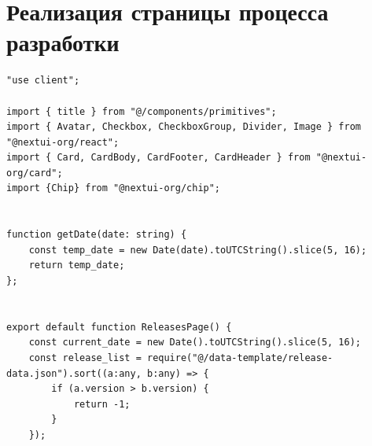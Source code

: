 \documentclass[master, och, diploma]{SCWorks}
\begin{document}
\section{Реализация страницы процесса разработки}
\begin{verbatim}
"use client";

import { title } from "@/components/primitives";
import { Avatar, Checkbox, CheckboxGroup, Divider, Image } from "@nextui-org/react";
import { Card, CardBody, CardFooter, CardHeader } from "@nextui-org/card";
import {Chip} from "@nextui-org/chip";


function getDate(date: string) {
    const temp_date = new Date(date).toUTCString().slice(5, 16);
    return temp_date;
};


export default function ReleasesPage() {
    const current_date = new Date().toUTCString().slice(5, 16);
    const release_list = require("@/data-template/release-data.json").sort((a:any, b:any) => {
        if (a.version > b.version) {
            return -1;
        }
    });


\end{verbatim}
\end{document}
